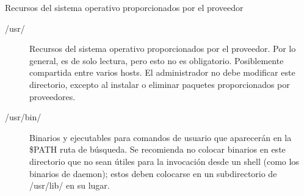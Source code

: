\begin{frame}[c]{Recursos del sistema operativo proporcionados por el proveedor}
  \begin{description}
    \item [/usr/] Recursos del sistema operativo proporcionados por el
			proveedor. Por lo general, es de solo lectura, pero esto no es
			obligatorio. Posiblemente compartida entre varios hosts.
			El administrador no debe modificar este directorio, excepto al
			instalar o eliminar paquetes proporcionados por proveedores.
    \item [/usr/bin/] Binarios y ejecutables para comandos de usuario que
			aparecerán en la \$PATH ruta de búsqueda. Se recomienda no colocar
			binarios en este directorio que no sean útiles para la invocación
			desde un shell (como los binarios de daemon); estos deben colocarse en
			un subdirectorio de /usr/lib/ en su lugar.

  \end{description}
\end{frame}
